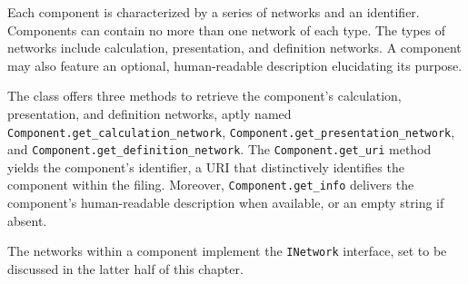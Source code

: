 Each component is characterized by a series of networks and an identifier.
Components can contain no more than one network of each type.
The types of networks include calculation, presentation, and definition networks.
A component may also feature an optional, human-readable description elucidating its purpose.

The class offers three methods to retrieve the component's calculation, presentation, and definition networks,
aptly named \texttt{Component.get\_calculation\_network}, \texttt{Component.get\_presentation\_network}, and \texttt{Component.get\_definition\_network}.
The \texttt{Component.get\_uri} method yields the component's identifier, a URI that distinctively identifies the component within the filing.
Moreover, \texttt{Component.get\_info} delivers the component's human-readable description when available, or an empty string if absent.

The networks within a component implement the \texttt{INetwork} interface, set to be discussed in the latter half of this chapter.
